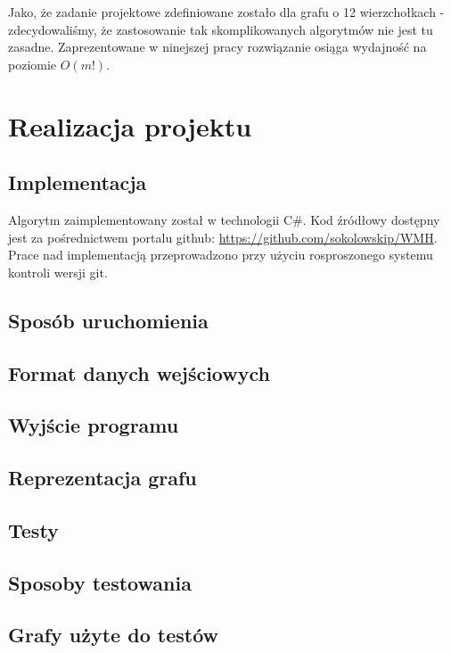 \documentclass[a4 122pt]{article}
\begin{document}
		Jako, że zadanie projektowe zdefiniowane zostało dla grafu o 12 wierzchołkach - zdecydowaliśmy, że zastosowanie tak skomplikowanych algorytmów nie jest tu zasadne. 
		Zaprezentowane w ninejszej pracy rozwiązanie osiąga wydajność na poziomie $O(m!)$.

	\pagebreak
	
\section{Realizacja projektu}

		
	\subsection{Implementacja}

		Algorytm zaimplementowany został w technologii C\#.
		Kod źródłowy dostępny jest za pośrednictwem portalu github: \url{https://github.com/sokolowskip/WMH}.
		Prace nad implementacją przeprowadzono przy użyciu rosproszonego systemu kontroli wersji git.

	\subsection{Sposób uruchomienia}

	\subsection{Format danych wejściowych}

	\subsection{Wyjście programu}

	\subsection{Reprezentacja grafu}

\subsection{Testy}

	\subsection{Sposoby testowania}

	\subsection{Grafy użyte do testów}
\end{document}

